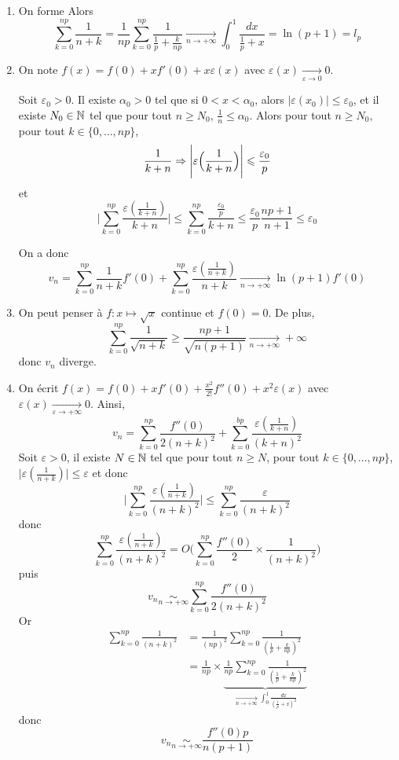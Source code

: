 \begin{solution}
	\phantom{}
	\begin{enumerate}
		\item On forme 
		Alors 
		$$\sum_{k=0}^{np}\frac{1}{n+k}=\frac{1}{np}\sum_{k=0}^{np}\frac{1}{\frac{1}{p}+\frac{k}{np}}\xrightarrow[n\to+\infty]{}\int_{0}^{1}\frac{dx}{\frac{1}{p}+x}=\ln(p+1)=l_{p}$$

		\item On note $f(x)=f(0)+xf'(0)+x\varepsilon(x)$ avec $\varepsilon(x)\xrightarrow[\varepsilon\to0]{}0$. 
		
		Soit $\varepsilon_{0}>0$. Il existe $\alpha_{0}>0$ tel que si $0<x<\alpha_{0}$, alors $\vert\varepsilon(x_{0})\vert\leqslant\varepsilon_{0}$, et il existe $N_{0}\in\mathbb{N}$ tel que pour tout $n\geqslant N_{0}$, $\frac{1}{n}\leqslant\alpha_{0}$. Alors pour tout $n\geqslant N_{0}$, pour tout $k\in\{0,\dots,np\}$, 
		$$\frac{1}{k+n}\Rightarrow \Biggl\vert\varepsilon\Bigl(\frac{1}{k+n}\Bigr)\Biggr\vert\leqslant\frac{\varepsilon_{0}}{p}$$
		et
		$$\Biggl\vert\sum_{k=0}^{np}\frac{\varepsilon(\frac{1}{k+n})}{k+n}\Biggr\vert\leqslant\sum_{k=0}^{np}\frac{\frac{\varepsilon_{0}}{p}}{k+n}\leqslant\frac{\varepsilon_{0}}{p}\frac{np+1}{n+1}\leqslant\varepsilon_{0}$$

		On a donc
		$$v_{n}=\sum_{k=0}^{np}\frac{1}{n+k}f'(0)+\sum_{k=0}^{np}\frac{\varepsilon(\frac{1}{n+k})}{n+k}\xrightarrow[n\to+\infty]{}\ln(p+1)f'(0)$$

		\item On peut penser à $f\colon x\mapsto\sqrt{x}$ continue et $f(0)=0$. De plus,
		$$\sum_{k=0}^{np}\frac{1}{\sqrt{n+k}}\geqslant\frac{np+1}{\sqrt{n(p+1)}}\xrightarrow[n\to+\infty]{}+\infty$$
		donc $v_{n}$ diverge.

		\item On écrit $f(x)=f(0)+xf'(0)+\frac{x^{2}}{2!}f''(0)+x^{2}\varepsilon(x)$ avec $\varepsilon(x)\xrightarrow[\varepsilon\to+\infty]{}0$. Ainsi, 
		$$v_{n}=\sum_{k=0}^{np}\frac{f''(0)}{2(n+k)^{2}}+\sum_{k=0}^{bp}\frac{\varepsilon(\frac{1}{k+n})}{(k+n)^{2}}$$
		Soit $\varepsilon>0$, il existe $N\in\mathbb{N}$ tel que pour tout $n\geqslant N$, pour tout $k\in\{0,\dots,np\}$, $\vert\varepsilon(\frac{1}{n+k})\vert\leqslant\varepsilon$ et donc 
		$$\Biggl\vert\sum_{k=0}^{np}\frac{\varepsilon(\frac{1}{n+k})}{(n+k)^{2}}\Biggr\vert\leqslant\sum_{k=0}^{np}\frac{\varepsilon}{(n+k)^{2}}$$
		donc 
		$$\sum_{k=0}^{np}\frac{\varepsilon(\frac{1}{n+k})}{(n+k)^{2}}=O\Biggl(\sum_{k=0}^{np}\frac{f''(0)}{2}\times\frac{1}{(n+k)^{2}}\Biggr)$$
		puis
		$$v_{n}\underset{n\to+\infty}{\sim}\sum_{k=0}^{np}\frac{f''(0)}{2(n+k)^{2}}$$
		Or 
		\begin{align*}
			\sum_{k=0}^{np}\frac{1}{(n+k)^{2}}
			&=\frac{1}{(np)^{2}}\sum_{k=0}^{np}\frac{1}{(\frac{1}{p}+\frac{k}{np})^{2}}\\
			&=\frac{1}{np}\times \underbrace{\frac{1}{np}\sum_{k=0}^{np}\frac{1}{(\frac{1}{p}+\frac{k}{np})^{2}}}_{\xrightarrow[n\to+\infty]{}\int_{0}^{1}\frac{dx}{(\frac{1}{p}+x)^{2}}}
		\end{align*}
		donc 
		$$v_{n}\underset{n\to+\infty}{\sim}\frac{f''(0)p}{n(p+1)}$$
	\end{enumerate}
\end{solution}

